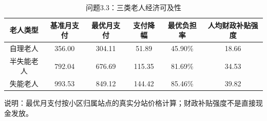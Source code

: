 \begin{table}[h]
\centering
\caption{问题3.3：三类老人经济可及性}
\begin{tabular}{|c|c|c|c|c|c|}
\hline
老人类型 & 基准月支付 & 最优月支付 & 支付降幅 & 最优负担率 & 人均财政补贴强度 \\
\hline
自理老人 & 356.00 & 304.11 & 51.89 & 45.90\% & 18.66 \\
半失能老人 & 792.04 & 676.69 & 115.35 & 81.69\% & 34.53 \\
失能老人 & 993.53 & 849.12 & 144.42 & 85.46\% & 39.82 \\
\hline
\end{tabular}
\vspace{0.2cm}
说明：最优月支付按小区归属站点的真实分站价格计算；财政补贴强度不是直接现金发放。
\end{table}